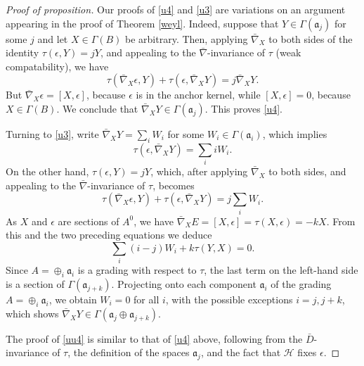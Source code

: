 \documentclass[leqno,12pt]{amsart} %
\begin{document}
\begin{proof}[Proof of proposition]
  Our proofs of \eqref{u4} and \eqref{u3} are variations on an argument appearing in the
  proof of Theorem \ref{weyl}.  Indeed, suppose that $Y \in \Gamma({\mathfrak a}_j)$ for
  some $j$ and let $X \in \Gamma(B)$ be arbitrary. Then, applying $\bar\nabla_X$ to both
  sides of the identity $\tau(\epsilon, Y) = jY$, and appealing to the
  $\bar\nabla$-invariance of $\tau$ (weak compatability), we have
\begin{equation*}
    \tau(\bar\nabla_{X}\epsilon, Y) + \tau(\epsilon, \bar\nabla_XY) = j \bar\nabla_XY.
\end{equation*}
But $\bar\nabla_{X} \epsilon = [X, \epsilon]$, because $\epsilon$ is in the anchor kernel, while $[X, \epsilon] = 0 $,
because $X \in \Gamma(B)$. We conclude that $\bar\nabla_XY \in \Gamma({\mathfrak
  a}_j)$. This proves \eqref{u4}.

Turning to \eqref{u3}, write $\bar\nabla_XY=\sum_iW_i$ for
  some $W_i \in \Gamma({\mathfrak a}_i)$, which implies
\begin{equation*}
    \tau(\epsilon, \bar\nabla_XY) = \sum_iiW_i.
\end{equation*}
On the other hand, $\tau(\epsilon, Y) = jY$, which, after applying $\bar\nabla_X$ to both
sides, and appealing to the $\bar\nabla$-invariance of $\tau $, becomes
\begin{equation*}
  \tau(\bar\nabla_X \epsilon, Y) + \tau(\epsilon, \bar\nabla_XY) = j\sum_iW_i.
\end{equation*}
As $X$ and $\epsilon$ are sections of $A^0$, we have
$\bar\nabla_X E = [X, \epsilon] = \tau(X, \epsilon) = -kX$. From this and the two preceding equations we
deduce
\begin{equation*}
   \sum_i(i-j)W_i + k \tau(Y, X) =0.
\end{equation*}
Since $A = \oplus_i {\mathfrak a}_i$ is a grading with respect to $\tau$, the last term on
the left-hand side is a section of $\Gamma({\mathfrak a}_{j+k})$. Projecting onto each
component ${\mathfrak a}_i$ of the grading $A = \oplus_i {\mathfrak a}_i$, we obtain
$W_i = 0$ for all $i$, with the possible exceptions $i=j, j+k$, which shows
$\bar\nabla_XY \in \Gamma({\mathfrak a}_j \oplus {\mathfrak a}_{j+k})$.

The proof of \eqref{uu4} is similar to that of \eqref{u4} above, following from the
$\bar D$-invariance of $\tau $, the definition of the spaces ${\mathfrak a}_j$, and the
fact that ${\mathcal H} $ fixes $\epsilon$.
\end{proof}
\end{document}
